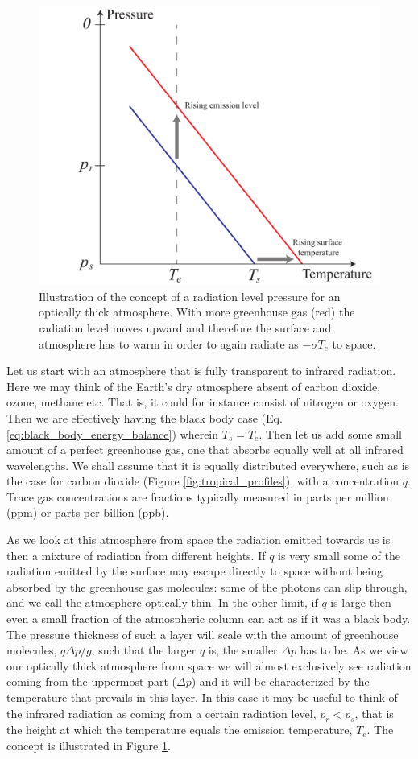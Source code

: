 \documentclass[12pt]{book}
\begin{document}
\begin{figure}
\begin{center}
\includegraphics[width=10 cm]{../illustrations/Gaseous_atmosphere_radiation_level}
\end{center}
\caption{ Illustration of the concept of a radiation level pressure for an optically thick atmosphere. With more greenhouse gas (red) the radiation level moves upward and therefore the surface and atmosphere has to warm in order to again radiate as $-\sigma T_e$ to space.   } 
\label{fig:radiation_level}
\end{figure}

Let us start with an atmosphere that is fully transparent to infrared radiation. Here we may think of the Earth's dry atmosphere absent of carbon dioxide, ozone, methane etc. That is, it could for instance consist of nitrogen or oxygen. Then we are effectively having the black body case (Eq. \ref{eq:black_body_energy_balance}) wherein $T_s = T_e$. Then let us add some small amount of a perfect greenhouse gas, one that absorbs equally well at all infrared wavelengths. We shall assume that it is equally distributed everywhere, such as is the case for carbon dioxide (Figure \ref{fig:tropical_profiles}), with a concentration $q$. Trace gas concentrations are fractions typically measured in parts per million (ppm) or parts per billion (ppb).

As we look at this atmosphere from space the radiation emitted towards us is then  a mixture of radiation from different heights. If $q$ is very small some of the radiation emitted by the surface may escape directly to space without being absorbed by the greenhouse gas molecules: some of the photons can slip through, and we call the atmosphere optically thin. In the other limit, if $q$ is large then even a small fraction of the atmospheric column can act as if it was a black body. The pressure thickness of such a layer will scale with the amount of greenhouse molecules, $q \Delta p/g$, such that the larger $q$ is, the smaller $\Delta p$ has to be. As we view our optically thick atmosphere from space we will almost exclusively see radiation coming from the uppermost part ($\Delta p$) and it will be characterized by the temperature that prevails in this layer. In this case it may be useful to think of the infrared radiation as coming from a certain radiation level, $p_r < p_s$, that is the height at which the temperature equals the emission temperature, $T_e$. The concept is illustrated in Figure \ref{fig:radiation_level}.
\end{document}
